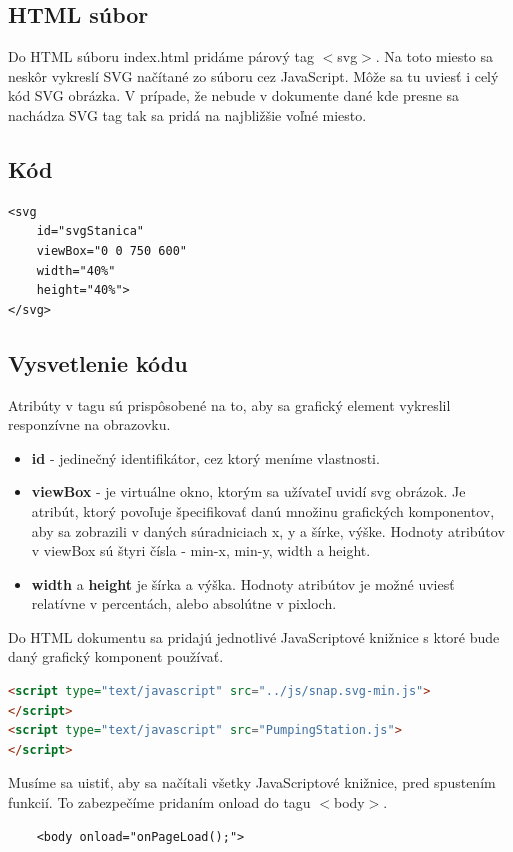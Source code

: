 \subsection{HTML súbor}
Do HTML súboru index.html pridáme párový tag $<$svg$>$.  Na toto miesto sa neskôr vykreslí SVG načítané zo súboru cez JavaScript. Môže sa tu uviesť i celý kód SVG obrázka. V prípade, že nebude v dokumente dané kde presne sa nachádza SVG tag tak sa pridá na najbližšie voľné miesto. 
\subsection{Kód}
\begin{lstlisting}
<svg 
	id="svgStanica" 
	viewBox="0 0 750 600" 
	width="40%" 
	height="40%"> 
</svg>
\end{lstlisting}

\subsection{Vysvetlenie kódu}
Atribúty v tagu sú prispôsobené na to, aby sa grafický element vykreslil responzívne na obrazovku.
\begin{itemize}
\item  \textbf{id} - jedinečný identifikátor, cez ktorý meníme vlastnosti.
\item 	\textbf{viewBox} - je virtuálne okno, ktorým sa užívateľ uvidí svg obrázok. Je atribút, ktorý povoľuje špecifikovať danú množinu grafických komponentov, aby sa zobrazili v daných súradniciach x, y a šírke, výške. Hodnoty atribútov v viewBox sú štyri čísla - min-x, min-y, width a height. 
\item 	\textbf{width} a \textbf{height} je šírka a výška. Hodnoty atribútov je možné uviesť relatívne v percentách, alebo absolútne v pixloch. 
\end{itemize}

Do HTML dokumentu sa pridajú jednotlivé JavaScriptové knižnice s ktoré bude daný grafický komponent používať. 
\begin{lstlisting}[language = HTML]
<script type="text/javascript" src="../js/snap.svg-min.js">
</script>
<script type="text/javascript" src="PumpingStation.js">
</script>
\end{lstlisting}

Musíme sa uistiť, aby sa načítali všetky JavaScriptové knižnice, pred spustením funkcií. To zabezpečíme pridaním  onload do tagu $<$body$>$. 
\begin{lstlisting}
	<body onload="onPageLoad();">
\end{lstlisting}



